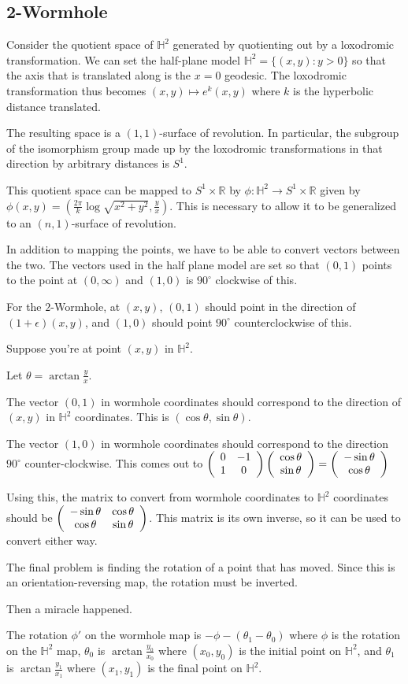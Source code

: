 \subsection{2-Wormhole}

Consider the quotient space of $\mathbb{H}^2$ generated by quotienting out by a loxodromic transformation. We can set the half-plane model $\mathbb{H}^2 = \{(x,y):y>0\}$ so that the axis that is translated along is the $x=0$ geodesic. The loxodromic transformation thus becomes $(x,y) \mapsto e^k(x,y)$ where $k$ is the hyperbolic distance translated.

The resulting space is a $(1,1)$-surface of revolution. In particular, the subgroup of the isomorphism group made up by the loxodromic transformations in that direction by arbitrary distances is $S^1$.

This quotient space can be mapped to $S^1 \times \mathbb{R}$ by $\phi:\mathbb{H}^2 \to S^1 \times \mathbb{R}$ given by $\phi(x,y) = \left(\frac{2\pi}{k}\log\sqrt{x^2+y^2},\frac{y}{x}\right)$. This is necessary to allow it to be generalized to an $(n,1)$-surface of revolution.


In addition to mapping the points, we have to be able to convert vectors between the two. The vectors used in the half plane model are set so that $(0,1)$ points to the point at $(0,\infty)$ and $(1,0)$ is $90^\circ$ clockwise of this.

For the $2$-Wormhole, at $(x,y)$, $(0,1)$ should point in the direction of $(1+\epsilon)(x,y)$, and $(1,0)$ should point $90^\circ$ counterclockwise of this.

Suppose you're at point $(x,y)$ in $\mathbb{H}^2$.

Let $\theta = \arctan\frac{y}{x}$.

The vector $(0,1)$ in wormhole coordinates should correspond to the direction of $(x,y)$ in $\mathbb{H}^2$ coordinates. This is $(\cos\theta,\sin\theta)$.

The vector $(1,0)$ in wormhole coordinates should correspond to the direction $90^\circ$ counter-clockwise. This comes out to $\left(\begin{array}{ccc} 0 & -1 \\1 & 0 \end{array} \right)\left(\begin{array}{ccc} \cos\theta \\\sin\theta \end{array} \right) = \left(\begin{array}{ccc} -\sin\theta \\\cos\theta \end{array} \right)$

Using this, the matrix to convert from wormhole coordinates to $\mathbb{H}^2$ coordinates should be $\left(\begin{array}{ccc} -\sin\theta & \cos\theta \\\cos\theta & \sin\theta \end{array} \right)$. This matrix is its own inverse, so it can be used to convert either way.


The final problem is finding the rotation of a point that has moved. Since this is an orientation-reversing map, the rotation must be inverted.

Then a miracle happened.

The rotation $\phi'$ on the wormhole map is $-\phi-(\theta_1-\theta_0)$ where $\phi$ is the rotation on the $\mathbb{H}^2$ map, $\theta_0$ is $\arctan\frac{y_0}{x_0}$ where $(x_0,y_0)$ is the initial point on $\mathbb{H}^2$, and $\theta_1$ is $\arctan\frac{y_1}{x_1}$ where $(x_1,y_1)$ is the final point on $\mathbb{H}^2$.